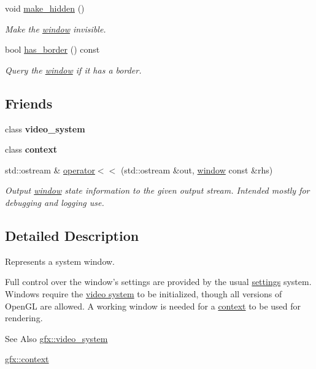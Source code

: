 \begin{DoxyCompactItemize}
void \hyperlink{classgfx_1_1window_a7ef4c71a39ca077ec52564ec0324af58}{make\-\_\-hidden} ()
\begin{DoxyCompactList}\small\item\em Make the \hyperlink{classgfx_1_1window}{window} invisible. \end{DoxyCompactList}\item 
bool \hyperlink{classgfx_1_1window_a075300e632e6d7694a0c408951b2d9f4}{has\-\_\-border} () const 
\begin{DoxyCompactList}\small\item\em Query the \hyperlink{classgfx_1_1window}{window} if it has a border. \end{DoxyCompactList}\end{DoxyCompactItemize}
\subsection*{Friends}
\begin{DoxyCompactItemize}
\item 
\hypertarget{classgfx_1_1window_abfd69a86b028655cf7807981b1c58526}{class {\bfseries video\-\_\-system}}\label{classgfx_1_1window_abfd69a86b028655cf7807981b1c58526}

\item 
\hypertarget{classgfx_1_1window_ac78d499d6bdacfe4cc1f67b4ce865513}{class {\bfseries context}}\label{classgfx_1_1window_ac78d499d6bdacfe4cc1f67b4ce865513}

\item 
std\-::ostream \& \hyperlink{classgfx_1_1window_aabe1db27f980b7901b4147e5a31dc403}{operator$<$$<$} (std\-::ostream \&out, \hyperlink{classgfx_1_1window}{window} const \&rhs)
\begin{DoxyCompactList}\small\item\em Output \hyperlink{classgfx_1_1window}{window} state information to the given output stream. Intended mostly for debugging and logging use. \end{DoxyCompactList}\end{DoxyCompactItemize}


\subsection{Detailed Description}
Represents a system window. 

Full control over the window's settings are provided by the usual \hyperlink{classgfx_1_1window_1_1settings}{settings} system. Windows require the \hyperlink{classgfx_1_1video__system}{video system} to be initialized, though all versions of Open\-G\-L are allowed. A working window is needed for a \hyperlink{classgfx_1_1context}{context} to be used for rendering. \begin{DoxySeeAlso}{See Also}
\hyperlink{classgfx_1_1video__system}{gfx\-::video\-\_\-system} 

\hyperlink{classgfx_1_1context}{gfx\-::context} 
\end{DoxySeeAlso}


